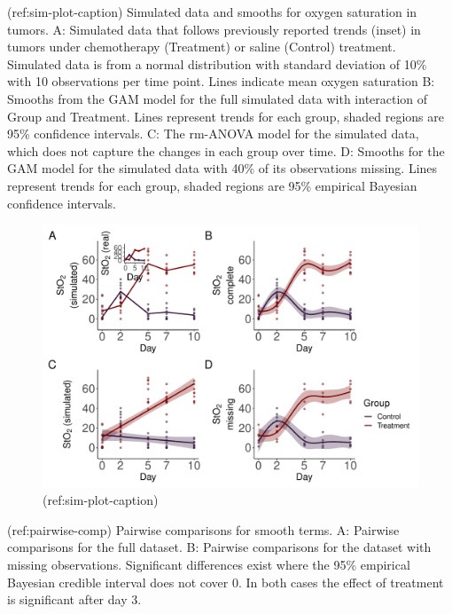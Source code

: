 \documentclass[Royal,times,sagev]{sagej}
\begin{document}
(ref:sim-plot-caption) Simulated data and smooths for oxygen saturation
in tumors. A: Simulated data that follows previously reported trends
(inset) in tumors under chemotherapy (Treatment) or saline (Control)
treatment. Simulated data is from a normal distribution with standard
deviation of 10\% with 10 observations per time point. Lines indicate
mean oxygen saturation B: Smooths from the GAM model for the full
simulated data with interaction of Group and Treatment. Lines represent
trends for each group, shaded regions are 95\% confidence intervals. C:
The rm-ANOVA model for the simulated data, which does not capture the
changes in each group over time. D: Smooths for the GAM model for the
simulated data with 40\% of its observations missing. Lines represent
trends for each group, shaded regions are 95\% empirical Bayesian
confidence intervals.

\begin{figure}

{\centering \includegraphics[width=0.75\linewidth]{Full_document_SAGE_files/figure-latex/sim-smooth-plot-1} 

}

\caption{(ref:sim-plot-caption)}\label{fig:sim-smooth-plot}
\end{figure}

(ref:pairwise-comp) Pairwise comparisons for smooth terms. A: Pairwise
comparisons for the full dataset. B: Pairwise comparisons for the
dataset with missing observations. Significant differences exist where
the 95\% empirical Bayesian credible interval does not cover 0. In both
cases the effect of treatment is significant after day 3.
\end{document}
